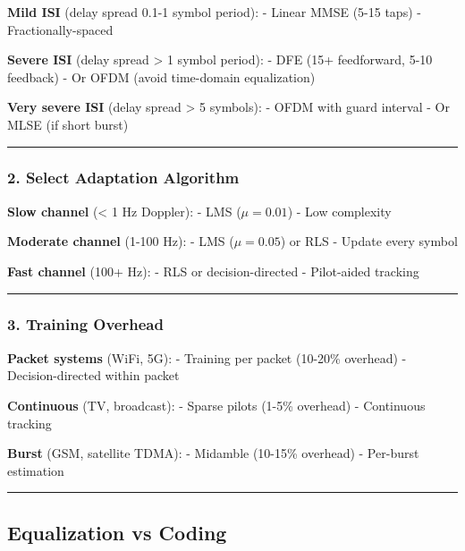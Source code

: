 \textbf{Mild ISI} (delay spread 0.1-1 symbol period): - Linear MMSE
(5-15 taps) - Fractionally-spaced

\textbf{Severe ISI} (delay spread \textgreater{} 1 symbol period): - DFE
(15+ feedforward, 5-10 feedback) - Or OFDM (avoid time-domain
equalization)

\textbf{Very severe ISI} (delay spread \textgreater{} 5 symbols): - OFDM
with guard interval - Or MLSE (if short burst)

\begin{center}\rule{0.5\linewidth}{0.5pt}\end{center}

\subsubsection{2. Select Adaptation
Algorithm}\label{select-adaptation-algorithm}

\textbf{Slow channel} (\textless{} 1 Hz Doppler): - LMS (\(\mu = 0.01\))
- Low complexity

\textbf{Moderate channel} (1-100 Hz): - LMS (\(\mu = 0.05\)) or RLS -
Update every symbol

\textbf{Fast channel} (100+ Hz): - RLS or decision-directed -
Pilot-aided tracking

\begin{center}\rule{0.5\linewidth}{0.5pt}\end{center}

\subsubsection{3. Training Overhead}\label{training-overhead}

\textbf{Packet systems} (WiFi, 5G): - Training per packet (10-20\%
overhead) - Decision-directed within packet

\textbf{Continuous} (TV, broadcast): - Sparse pilots (1-5\% overhead) -
Continuous tracking

\textbf{Burst} (GSM, satellite TDMA): - Midamble (10-15\% overhead) -
Per-burst estimation

\begin{center}\rule{0.5\linewidth}{0.5pt}\end{center}

\subsection{Equalization vs Coding}\label{equalization-vs-coding}

